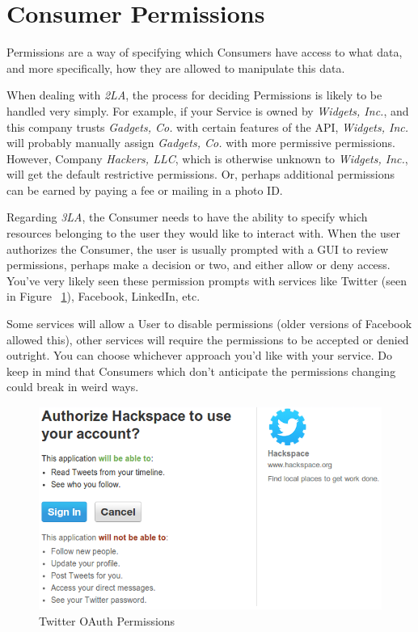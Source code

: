 \documentclass{book}
\begin{document}
\section{Consumer Permissions}

Permissions are a way of specifying which Consumers have access to what data, and more specifically, how they are allowed to manipulate this data.

When dealing with \emph{2LA}, the process for deciding Permissions is likely to be handled very simply. For example, if your Service is owned by \emph{Widgets, Inc.}, and this company trusts \emph{Gadgets, Co.} with certain features of the API, \emph{Widgets, Inc.} will probably manually assign \emph{Gadgets, Co.} with more permissive permissions. However, Company \emph{Hackers, LLC}, which is otherwise unknown to \emph{Widgets, Inc.}, will get the default restrictive permissions. Or, perhaps additional permissions can be earned by paying a fee or mailing in a photo ID.

Regarding \emph{3LA}, the Consumer needs to have the ability to specify which resources belonging to the user they would like to interact with. When the user authorizes the Consumer, the user is usually prompted with a GUI to review permissions, perhaps make a decision or two, and either allow or deny access. You've very likely seen these permission prompts with services like Twitter (seen in Figure ~\ref{fig:twitteroauth}), Facebook, LinkedIn, etc.

Some services will allow a User to disable permissions (older versions of Facebook allowed this), other services will require the permissions to be accepted or denied outright. You can choose whichever approach you'd like with your service. Do keep in mind that Consumers which don't anticipate the permissions changing could break in weird ways.

\begin{figure}[ht!]
\centering
\includegraphics[width=120mm]{images/permissions-twitter.png}
\caption{Twitter OAuth Permissions}
\label{fig:twitteroauth}
\end{figure}
\end{document}
